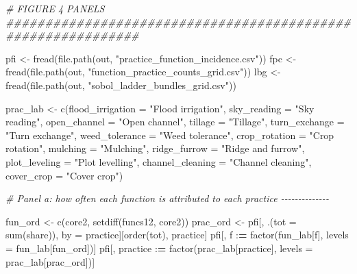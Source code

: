 \documentclass[
  11pt,
]{article}
\newenvironment{Shaded}{\begin{snugshade}}{\end{snugshade}}
\newcommand{\AttributeTok}[1]{\textcolor[rgb]{0.77,0.63,0.00}{#1}}
\newcommand{\CommentTok}[1]{\textcolor[rgb]{0.56,0.35,0.01}{\textit{#1}}}
\newcommand{\ErrorTok}[1]{\textcolor[rgb]{0.64,0.00,0.00}{\textbf{#1}}}
\newcommand{\FunctionTok}[1]{\textcolor[rgb]{0.00,0.00,0.00}{#1}}
\newcommand{\NormalTok}[1]{#1}
\newcommand{\OtherTok}[1]{\textcolor[rgb]{0.56,0.35,0.01}{#1}}
\newcommand{\SpecialCharTok}[1]{\textcolor[rgb]{0.00,0.00,0.00}{#1}}
\newcommand{\StringTok}[1]{\textcolor[rgb]{0.31,0.60,0.02}{#1}}
\begin{document}
\begin{Shaded}
\begin{Highlighting}[]
\CommentTok{\# FIGURE 4 PANELS \#\#\#\#\#\#\#\#\#\#\#\#\#\#\#\#\#\#\#\#\#\#\#\#\#\#\#\#\#\#\#\#\#\#\#\#\#\#\#\#\#\#\#\#\#\#\#\#\#\#\#\#\#\#\#\#\#\#\#\#\#}

\NormalTok{pfi }\OtherTok{\textless{}{-}} \FunctionTok{fread}\NormalTok{(}\FunctionTok{file.path}\NormalTok{(out, }\StringTok{"practice\_function\_incidence.csv"}\NormalTok{))}
\NormalTok{fpc }\OtherTok{\textless{}{-}} \FunctionTok{fread}\NormalTok{(}\FunctionTok{file.path}\NormalTok{(out, }\StringTok{"function\_practice\_counts\_grid.csv"}\NormalTok{))}
\NormalTok{lbg }\OtherTok{\textless{}{-}} \FunctionTok{fread}\NormalTok{(}\FunctionTok{file.path}\NormalTok{(out, }\StringTok{"sobol\_ladder\_bundles\_grid.csv"}\NormalTok{))}

\NormalTok{prac\_lab }\OtherTok{\textless{}{-}} \FunctionTok{c}\NormalTok{(}\AttributeTok{flood\_irrigation =} \StringTok{"Flood irrigation"}\NormalTok{, }\AttributeTok{sky\_reading =} \StringTok{"Sky reading"}\NormalTok{,}
              \AttributeTok{open\_channel =} \StringTok{"Open channel"}\NormalTok{, }\AttributeTok{tillage =} \StringTok{"Tillage"}\NormalTok{,}
              \AttributeTok{turn\_exchange =} \StringTok{"Turn exchange"}\NormalTok{, }\AttributeTok{weed\_tolerance =} \StringTok{"Weed tolerance"}\NormalTok{,}
              \AttributeTok{crop\_rotation =} \StringTok{"Crop rotation"}\NormalTok{, }\AttributeTok{mulching =} \StringTok{"Mulching"}\NormalTok{,}
              \AttributeTok{ridge\_furrow =} \StringTok{"Ridge and furrow"}\NormalTok{, }\AttributeTok{plot\_leveling =} \StringTok{"Plot levelling"}\NormalTok{,}
              \AttributeTok{channel\_cleaning =} \StringTok{"Channel cleaning"}\NormalTok{, }\AttributeTok{cover\_crop =} \StringTok{"Cover crop"}\NormalTok{)}

\CommentTok{\# Panel a: how often each function is attributed to each practice {-}{-}{-}{-}{-}{-}{-}{-}{-}{-}{-}{-}{-}{-}}

\NormalTok{fun\_ord }\OtherTok{\textless{}{-}} \FunctionTok{c}\NormalTok{(core2, }\FunctionTok{setdiff}\NormalTok{(funcs12, core2))}
\NormalTok{prac\_ord }\OtherTok{\textless{}{-}}\NormalTok{ pfi[, .(}\AttributeTok{tot =} \FunctionTok{sum}\NormalTok{(share)), by }\OtherTok{=}\NormalTok{ practice][}\FunctionTok{order}\NormalTok{(tot), practice]}
\NormalTok{pfi[, f }\SpecialCharTok{:}\ErrorTok{=} \FunctionTok{factor}\NormalTok{(fun\_lab[f], }\AttributeTok{levels =}\NormalTok{ fun\_lab[fun\_ord])]}
\NormalTok{pfi[, practice }\SpecialCharTok{:}\ErrorTok{=} \FunctionTok{factor}\NormalTok{(prac\_lab[practice], }\AttributeTok{levels =}\NormalTok{ prac\_lab[prac\_ord])]}


\end{Highlighting}
\end{Shaded}
\end{document}
